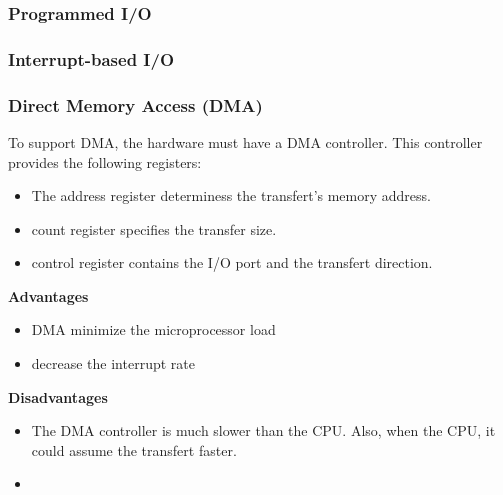 %
%
%

\begin{frame}
  \frametitle{Programmed I/O}



\end{frame}


%
%
%

\begin{frame}
  \frametitle{Interrupt-based I/O}



\end{frame}

%
%
%

\begin{frame}
  \frametitle{Direct Memory Access (DMA)}

  To support DMA, the hardware must have a DMA controller. This controller
  provides the following registers:

  \begin{itemize}
    \item The address register determiness the transfert's memory address.
    \item count register specifies the transfer size.
    \item control register contains the I/O port and the transfert direction.
  \end{itemize}

  \-

  {\bf Advantages}\\
  \begin{itemize}
    \item DMA minimize the microprocessor load
    \item decrease the interrupt rate
  \end{itemize}

  {\bf Disadvantages}\\
  \begin{itemize}
    \item The DMA controller is much slower than the CPU. Also, when the CPU,
      it could assume the transfert faster.
    \item 
  \end{itemize}

\end{frame}
